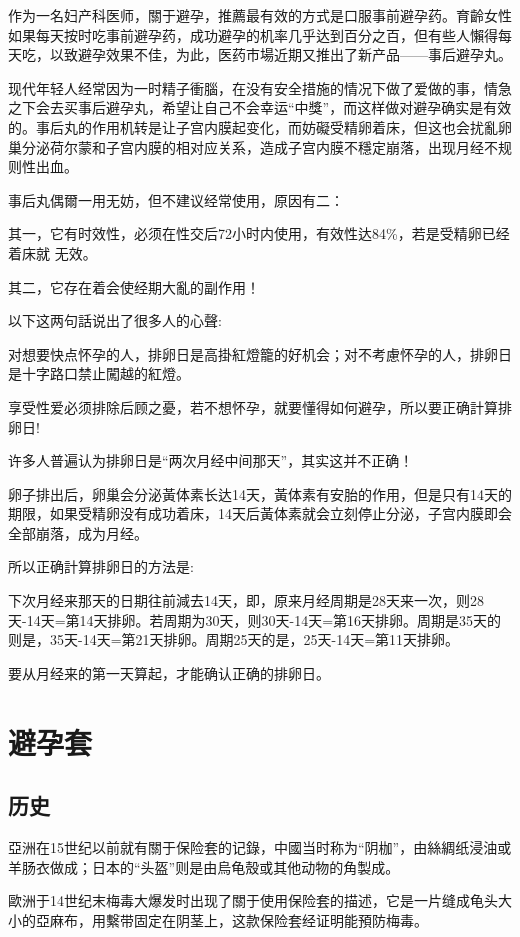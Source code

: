 \documentclass[12pt,UTF8]{ctexbook}
\begin{document}
作为一名妇产科医师，關于避孕，推薦最有效的方式是口服事前避孕药。育齡女性如果每天按时吃事前避孕药，成功避孕的机率几乎达到百分之百，但有些人懶得每天吃，以致避孕效果不佳，为此，医药市場近期又推出了新产品——事后避孕丸。

现代年轻人经常因为一时精子衝腦，在没有安全措施的情况下做了爱做的事，情急之下会去买事后避孕丸，希望让自己不会幸运“中獎”，而这样做对避孕确实是有效的。事后丸的作用机转是让子宫内膜起变化，而妨礙受精卵着床，但这也会扰亂卵巢分泌荷尔蒙和子宫内膜的相对应关系，造成子宫内膜不穩定崩落，出现月经不规则性出血。

事后丸偶爾一用无妨，但不建议经常使用，原因有二：

其一，它有时效性，必须在性交后72小时内使用，有效性达84\%，若是受精卵已经着床就
无效。

其二，它存在着会使经期大亂的副作用！

以下这两句話说出了很多人的心聲:

对想要快点怀孕的人，排卵日是高掛紅燈籠的好机会；对不考慮怀孕的人，排卵日是十字路口禁止闖越的紅燈。

享受性爱必须排除后顾之憂，若不想怀孕，就要懂得如何避孕，所以要正确計算排卵日!

许多人普遍认为排卵日是“两次月经中间那天”，其实这并不正确！

卵子排出后，卵巢会分泌黃体素长达14天，黃体素有安胎的作用，但是只有14天的期限，如果受精卵没有成功着床，14天后黃体素就会立刻停止分泌，子宫内膜即会全部崩落，成为月经。

所以正确計算排卵日的方法是:

下次月经来那天的日期往前減去14天，即，原来月经周期是28天来一次，则28天-14天=第14天排卵。若周期为30天，则30天-14天=第16天排卵。周期是35天的则是，35天-14天=第21天排卵。周期25天的是，25天-14天=第11天排卵。

要从月经来的第一天算起，才能确认正确的排卵日。

\section{避孕套}

\subsection{历史}

亞洲在15世纪以前就有關于保险套的记錄，中國当时称为“阴枷”，由絲綢纸浸油或羊肠衣做成；日本的“头盔”则是由烏龟殼或其他动物的角製成。

歐洲于14世纪末梅毒大爆发时出现了關于使用保险套的描述，它是一片缝成龟头大小的亞麻布，用繫带固定在阴茎上，这款保险套经证明能預防梅毒。
\end{document}

